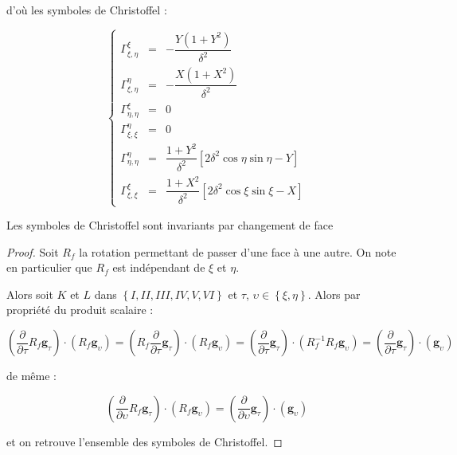 d'où les symboles de Christoffel :

\begin{equation}
\left\lbrace
\begin{array}{rcl}
\Gamma_{\xi,\eta}^{\xi} & = & - \dfrac{Y ( 1+Y^2)}{\delta^2}\\
\Gamma_{\xi,\eta}^{\eta} & = & - \dfrac{X(1+X^2)}{\delta^2}\\
\Gamma_{\eta,\eta}^{\xi} & = & 0 \\
\Gamma_{\xi,\xi}^{\eta} & = & 0 \\
\Gamma_{\eta,\eta}^{\eta} & = & \dfrac{1+Y^2}{\delta^2} \left[ 2 \delta^2 \cos \eta \sin \eta - Y \right]\\
\Gamma_{\xi,\xi}^{\xi} & = & \dfrac{1+X^2}{\delta^2} \left[ 2 \delta^2 \cos \xi \sin \xi - X \right]
\end{array}
\right.
\end{equation}

\begin{proposition}
Les symboles de Christoffel sont invariants par changement de face
\end{proposition}

\begin{proof}
Soit $R_f$ la rotation permettant de passer d'une face à une autre. On note en particulier que $R_f$ est indépendant de $\xi$ et $\eta$.

Alors soit $K$ et $L$ dans $\left\lbrace I, II, III, IV, V, VI \right\rbrace$ et $\tau$, $\upsilon \in \left\lbrace \xi, \eta \right\rbrace$. Alors par propriété du produit scalaire :

$$\left( \dfrac{\partial}{\partial \tau}  R_f \mathbf{g}_{\tau} \right) \cdot \left( R_f \mathbf{g}_{\upsilon} \right) = \left( R_f \dfrac{\partial}{\partial \tau}   \mathbf{g}_{\tau} \right) \cdot \left( R_f \mathbf{g}_{\upsilon} \right) =  \left( \dfrac{\partial}{\partial \tau}  \mathbf{g}_{\tau} \right) \cdot \left( R_f^{-1} R_f \mathbf{g}_{\upsilon} \right) =  \left( \dfrac{\partial}{\partial \tau}  \mathbf{g}_{\tau} \right) \cdot \left( \mathbf{g}_{\upsilon} \right)$$

de même :

$$\left( \dfrac{\partial}{\partial \upsilon}  R_f \mathbf{g}_{\tau} \right) \cdot \left( R_f \mathbf{g}_{\upsilon} \right) =  \left( \dfrac{\partial}{\partial \upsilon} \mathbf{g}_{\tau} \right) \cdot \left( \mathbf{g}_{\upsilon} \right)$$

et on retrouve l'ensemble des symboles de Christoffel.
\end{proof}






















